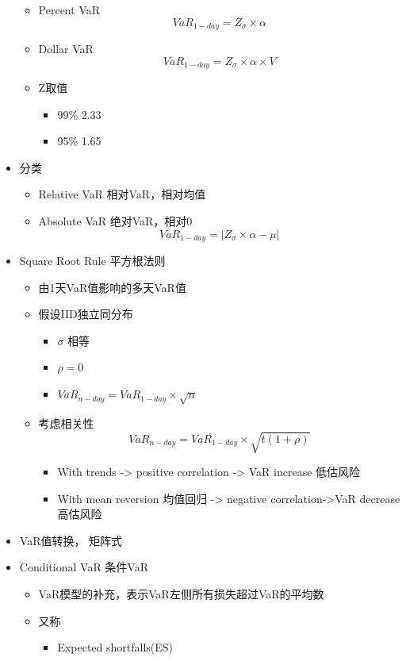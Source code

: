 \documentclass[a4paper,6pt,twoside,openany]{article}
\begin{document}
\begin{itemize}
  \begin{itemize}
  \item Percent VaR
    $$VaR_{1-day} = Z_{\sigma} \times \alpha$$
  \item Dollar VaR
    $$VaR_{1-day} = Z_{\sigma} \times \alpha \times V$$
  \item Z取值
    \begin{itemize}
    \item 99\% 2.33
    \item 95\% 1.65
    \end{itemize}
  \end{itemize}
\item 分类
  \begin{itemize}
  \item Relative VaR 相对VaR，相对均值
  \item Absolute VaR 绝对VaR，相对0
    $$VaR_{1-day} = | Z_{\sigma} \times \alpha - \mu |$$
  \end{itemize}
\item Square Root Rule 平方根法则
  \begin{itemize}
  \item 由1天VaR值影响的多天VaR值
  \item 假设IID独立同分布
    \begin{itemize}
    \item $\sigma$ 相等
    \item $\rho = 0$
    \item $VaR_{n-day} = VaR_{1-day} \times \sqrt{n}$
    \end{itemize}
  \item 考虑相关性 $$VaR_{n-day} = VaR_{1-day} \times \sqrt{t(1+\rho)}$$
    \begin{itemize}
    \item With trends -> positive correlation -> VaR increase 低估风险
    \item With mean reversion 均值回归 -> negative correlation->VaR decrease 高估风险
    \end{itemize}
  \end{itemize}
\item VaR值转换， 矩阵式
\item Conditional VaR 条件VaR
  \begin{itemize}
  \item VaR模型的补充，表示VaR左侧所有损失超过VaR的平均数
  \item 又称
    \begin{itemize}
    \item Expected shortfalls(ES)

\end{itemize}
\end{itemize}
\end{itemize}
\end{document}
